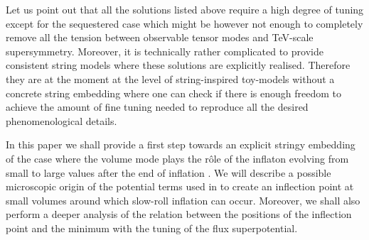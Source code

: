 \documentclass[11pt,a4paper]{article}
\begin{document}
Let us point out that all the solutions listed above require a high degree of tuning except for the sequestered case which might be however not enough to completely remove all the tension between observable tensor modes and TeV-scale supersymmetry. Moreover, it is technically rather complicated to provide consistent string models where these solutions are explicitly realised. Therefore they are at the moment at the level of string-inspired toy-models without a concrete string embedding where one can check if there is enough freedom to achieve the amount of fine tuning needed to reproduce all the desired phenomenological details.

In this paper we shall provide a first step towards an explicit stringy embedding of the case where the volume mode plays the r\^ole of the inflaton evolving from small to large values after the end of inflation \cite{Conlon:2008cj}. We will describe a possible microscopic origin of the potential terms used in \cite{Conlon:2008cj} to create an inflection point at small volumes around which slow-roll inflation can occur. Moreover, we shall also perform a deeper analysis of the relation between the positions of the inflection point and the minimum with the tuning of the flux superpotential.
\end{document}
